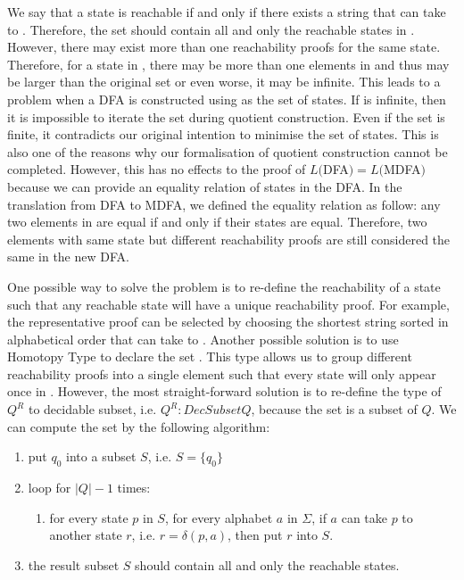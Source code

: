 \par We say that a state  is reachable if and
only if there exists a string  that can take  to
. Therefore, the set  should contain all and only the
reachable states in . However, there may exist more than one
reachability proofs for the same state. Therefore, for a state in , there may be
more than one elements in  and thus 
may be larger than the original set  or even worse, it may be
infinite. This leads to a problem when a DFA is constructed using
 as the set of states. If  is
infinite, then it is impossible to iterate the set during 
quotient construction. Even if the set  is finite, it
contradicts our original intention to minimise the set of states. This is also one of the
reasons why our formalisation of quotient construction cannot be
completed. However, this has no effects to the proof of \(L(\)DFA\() =
  L(\)MDFA\()\) because we can provide an equality relation of states in
the DFA. In the translation from DFA to MDFA, we defined
the equality relation as follow: any two elements in  are equal if and only
if their states are equal. Therefore, two elements with same state
but different reachability proofs are still considered the same in the new DFA. 

\par One possible way to solve the problem is to re-define the
reachability of a state such that any reachable state will have a
unique reachability proof. For example, the representative proof can
be selected by choosing the shortest string  sorted in
alphabetical order that can take  to . Another possible solution is to use
Homotopy Type to declare the set . This type allows us to
group different reachability proofs into a single element such that
every state will only appear once in . However, the most
straight-forward solution is to re-define the type of \(Q^R\) to
decidable subset, i.e. \(Q^R :
DecSubset Q\), because the set is a subset of \(Q\). We can compute
the set by the following algorithm:
\begin{enumerate}[nolistsep]
  \item put \(q_0\) into a subset \(S\), i.e. \(S = \{q_0\}\)
  \item loop for \(|Q| - 1\) times: 
  \begin{enumerate}
    \item for every state \(p\) in \(S\), for every alphabet \(a\) in
      \(\Sigma\), if \(a\) can take
      \(p\) to another state \(r\), i.e. \(r = \delta (p,a)\), then put \(r\) into \(S\). 
  \end{enumerate}
  \item the result subset \(S\) should contain all and only the
    reachable states. 
\end{enumerate}

